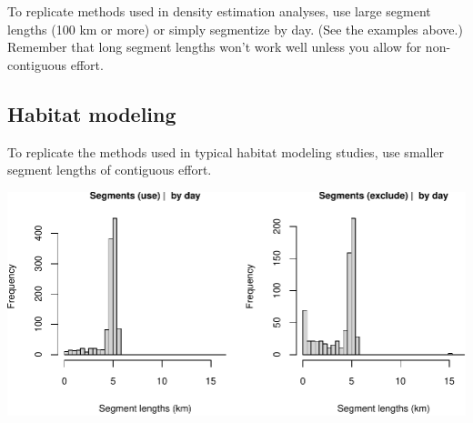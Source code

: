 \documentclass[
]{book}
\newenvironment{Shaded}{\begin{snugshade}}{\end{snugshade}}
\newcommand{\CommentTok}[1]{\textcolor[rgb]{0.56,0.35,0.01}{\textit{#1}}}
\newcommand{\DataTypeTok}[1]{\textcolor[rgb]{0.13,0.29,0.53}{#1}}
\newcommand{\DecValTok}[1]{\textcolor[rgb]{0.00,0.00,0.81}{#1}}
\newcommand{\FloatTok}[1]{\textcolor[rgb]{0.00,0.00,0.81}{#1}}
\newcommand{\KeywordTok}[1]{\textcolor[rgb]{0.13,0.29,0.53}{\textbf{#1}}}
\newcommand{\NormalTok}[1]{#1}
\newcommand{\OperatorTok}[1]{\textcolor[rgb]{0.81,0.36,0.00}{\textbf{#1}}}
\newcommand{\OtherTok}[1]{\textcolor[rgb]{0.56,0.35,0.01}{#1}}
\newcommand{\StringTok}[1]{\textcolor[rgb]{0.31,0.60,0.02}{#1}}
\begin{document}
To replicate methods used in density estimation analyses, use large segment lengths (100 km or more) or simply segmentize by day. (See the examples above.) Remember that long segment lengths won't work well unless you allow for non-contiguous effort.

\hypertarget{habitat-modeling}{%
\subsection*{Habitat modeling}\label{habitat-modeling}}

To replicate the methods used in typical habitat modeling studies, use smaller segment lengths of contiguous effort.

\begin{Shaded}
\end{Shaded}

\includegraphics{figures/unnamed-chunk-383-1.pdf}
\end{document}
